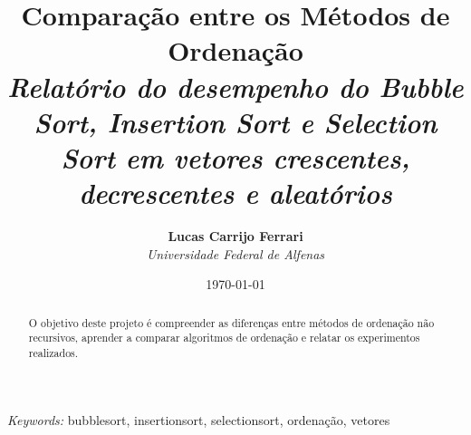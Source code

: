 \documentclass[11pt]{diazessay} %
\title{\textbf{Comparação entre os Métodos de Ordenação} \\ {\Large\itshape Relatório do desempenho do Bubble Sort, Insertion Sort e Selection Sort em vetores crescentes, decrescentes e aleatórios}} %
\author{\textbf{Lucas Carrijo Ferrari} \\ \textit{Universidade Federal de Alfenas}} %
\date{\today} %
\begin{document}
\maketitle %



\begin{abstract}
O objetivo deste projeto é compreender as diferenças entre métodos de ordenação não recursivos, aprender a comparar algoritmos de ordenação e relatar os experimentos realizados.
\end{abstract}

\hspace*{3.6mm}\textit{Keywords:} bubblesort, insertionsort, selectionsort, ordenação, vetores %

\vspace{30pt} %













\end{document}
